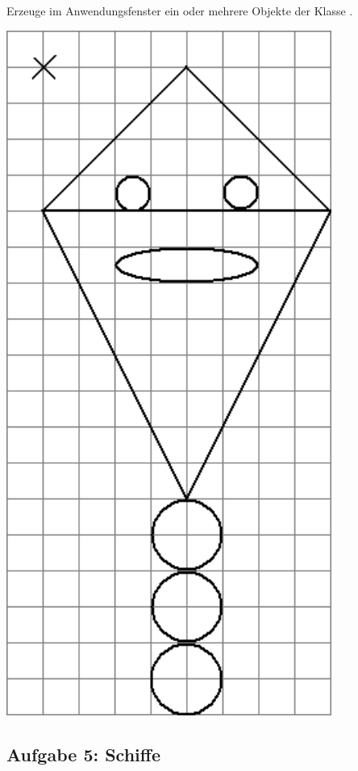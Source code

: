 \begin{compactenum}[a)]
\begin{minipage}{0.6\textwidth}
Erzeuge im Anwendungsfenster ein oder mehrere Objekte der Klasse
.
\end{minipage}
\hfill
\begin{minipage}{0.3\textwidth}
\includegraphics[width=0.8\textwidth]{./inf/SEKII/16_Java_Vererbung/Aufgabe4c.png}
\end{minipage}
\end{compactenum}


\subsection{Aufgabe 5: Schiffe}

